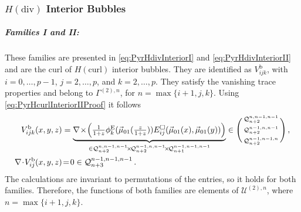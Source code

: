 \subsubsection{\texorpdfstring{$H(\mathrm{div})$}{Hdiv} Interior Bubbles}

\subparagraph{Families I and II:}
These families are presented in \eqref{eq:PyrHdivInteriorI} and \eqref{eq:PyrHdivInteriorII} and are the curl of $H(\mathrm{curl})$ interior bubbles.
They are identified as $V_{ijk}^\mathrm{b}$, with $i=0,\ldots,p-1$, $j=2,\ldots,p$, and $k=2,\ldots,p$.
They satisfy the vanishing trace properties and belong to $\Gamma^{(2),n}$, for $n=\max\{i+1,j,k\}$.
Using \eqref{eq:PyrHcurlInteriorIIProof} it follows
\begin{equation}
\begin{aligned}
	V_{ijk}^\mathrm{b}(x,y,z)&=
		\underbrace{\nabla\!\times\!\Big(\textstyle{\frac{1}{1+z}}\phi_k^\E(\vec{\mu}_{01}(\szzz))
			E_{ij}^\square(\vec{\mu}_{01}(x),\vec{\mu}_{01}(y))\Big)}_{
				\in\mathcal{Q}_{n+2}^{n,n-1,n-1}\!\times\!\mathcal{Q}_{n+2}^{n-1,n,n-1}\!\times\!\mathcal{Q}_{n+1}^{n-1,n-1,n-1}}
						\in\Bigg(\begin{smallmatrix}\mathcal{Q}_{n+2}^{n,n-1,n-1}\\[2pt]\mathcal{Q}_{n+2}^{n-1,n,n-1}\\[2pt]
							\mathcal{Q}_{n+2}^{n-1,n-1,n}\end{smallmatrix}\Bigg)\,,\\
	\nabla\!\cdot\! V_{ij}^\mathrm{b}(x,y,z)&\!=\!0\in\mathcal{Q}_{n+3}^{n-1,n-1,n-1}\,.
\end{aligned}
\end{equation}
The calculations are invariant to permutations of the entries, so it holds for both families.
Therefore, the functions of both families are elements of $\mathcal{U}^{(2),n}$, where $n=\max\{i+1,j,k\}$.

